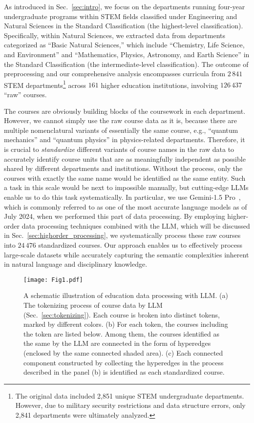 \documentclass{bmcart}
\begin{document}
As introduced in Sec.~\ref{sec:intro}, we focus on the departments running four-year undergraduate programs within STEM fields classified under Engineering and Natural Sciences in the Standard Classification (the highest-level classification). Specifically, within Natural Sciences, we extracted data from departments categorized as  ``Basic Natural Sciences,'' which include  ``Chemistry, Life Science, and Environment'' and  ``Mathematics, Physics, Astronomy, and Earth Science'' in the Standard Classification (the intermediate-level classification).
The outcome of preprocessing and our comprehensive analysis encompasses curricula from $2\,841$ STEM departments\footnote{The original data included 2,851 unique STEM undergraduate departments. However, due to military security restrictions and data structure errors, only 2,841 departments were ultimately analyzed.} across $161$ higher education institutions, involving $126\,437$ ``raw'' courses.

The courses are obviously building blocks of the coursework in each department. However, we cannot simply use the raw course data as it is, because there are multiple nomenclatural variants of essentially the same course, e.g., ``quantum mechanics'' and ``quantum physics'' in physics-related departments. Therefore, it is crucial to \textit{standardize} different variants of course names in the raw data to accurately identify course units that are as meaningfully independent as possible shared by different departments and institutions. Without the process, only the courses with exactly the same name would be identified as the same entity. Such a task in this scale would be next to impossible manually, but cutting-edge LLMs enable us to do this task systematically. In particular, we use Gemini-1.5 Pro~\cite{geminiteam2024gemini15unlockingmultimodal}, which is commonly referred to as one of the most accurate language models as of July 2024, when we performed this part of data processing.  
By employing higher-order data processing techniques combined with the LLM, which will be discussed in Sec.~\ref{sec:highorder_processing}, we systematically process these raw courses into $24\,476$ standardized courses. 
Our approach enables us to effectively process large-scale datasets while accurately capturing the semantic complexities inherent in natural language and disciplinary knowledge.

\begin{figure}
\texttt{[image: Fig1.pdf]} 
\caption{A schematic illustration of education data processing with LLM. (a) The tokenizing process of course data by LLM (Sec.~\ref{sec:tokenizing}). Each course is broken into distinct tokens, marked by different colors. (b) For each token, the courses including the token are listed below. Among them, the courses identified as the same by the LLM are connected in the form of hyperedges (enclosed by the same connected shaded area). 
(c) Each connected component constructed by collecting the hyperedges in the process described in the panel (b) is identified as each standardized course.}
\label{figure: llm and higher-order processing}
\end{figure}
\end{document}
